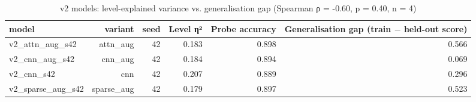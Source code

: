 \begin{table}[t]
\centering
\caption{v2 models: level-explained variance vs. generalisation gap (Spearman ρ = -0.60, p = 0.40, n = 4)}
\label{tab:probe_vs_gap}
\begin{tabular}{lrrrrr}
\toprule
model & variant & seed & Level η² & Probe accuracy & Generalisation gap (train $-$ held-out score) \\
\midrule
v2\_attn\_aug\_s42 & attn\_aug & 42 & 0.183 & 0.898 & 0.566 \\
v2\_cnn\_aug\_s42 & cnn\_aug & 42 & 0.184 & 0.894 & 0.069 \\
v2\_cnn\_s42 & cnn & 42 & 0.207 & 0.889 & 0.296 \\
v2\_sparse\_aug\_s42 & sparse\_aug & 42 & 0.179 & 0.897 & 0.523 \\
\bottomrule
\end{tabular}
\end{table}
